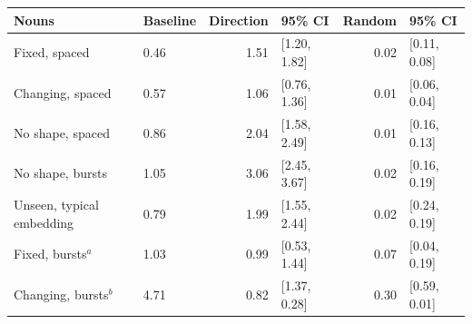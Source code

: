 \begin{tabular}{@{}llrlrl@{}}
\toprule
Nouns & Baseline & Direction & 95\% CI & Random & 95\% CI \\
\midrule
Fixed, spaced & 0.46 & 1.51 & [1.20, 1.82] & \textminus{}0.02 & [\textminus{}0.11, 0.08] \\
Changing, spaced & 0.57 & 1.06 & [0.76, 1.36] & \textminus{}0.01 & [\textminus{}0.06, 0.04] \\
No shape, spaced & 0.86 & 2.04 & [1.58, 2.49] & \textminus{}0.01 & [\textminus{}0.16, 0.13] \\
No shape, bursts & 1.05 & 3.06 & [2.45, 3.67] & 0.02 & [\textminus{}0.16, 0.19] \\
Unseen, typical embedding & 0.79 & 1.99 & [1.55, 2.44] & \textminus{}0.02 & [\textminus{}0.24, 0.19] \\
Fixed, bursts$^a$ & 1.03 & 0.99 & [0.53, 1.44] & 0.07 & [\textminus{}0.04, 0.19] \\
Changing, bursts$^b$ & 4.71 & \textminus{}0.82 & [\textminus{}1.37, \textminus{}0.28] & \textminus{}0.30 & [\textminus{}0.59, \textminus{}0.01] \\
\bottomrule
\end{tabular}
